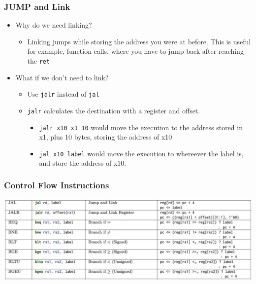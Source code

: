 \documentclass[10pt]{article}
\begin{document}
\subsubsection*{JUMP and Link}
\begin{itemize}
    \item Why do we need linking?
    \begin{itemize}
        \item Linking jumps while storing the address you were at before.  This is useful for example, function calls, where you have to jump back after reaching the \texttt{ret}
    \end{itemize}
    \item What if we don't need to link?
    \begin{itemize}
        \item Use \texttt{jalr} instead of \texttt{jal}
        \item \texttt{jalr} calculates the destination with a register and offset.
        \begin{itemize}
            \item \texttt{jalr x10 x1 10} would move the execution to the address stored in x1, plus 10 bytes, storing the address of x10
            \item \texttt{jal x10 label} would move the execution to whereever the label is, and store the address of x10.
        \end{itemize}
    \end{itemize}
\end{itemize}
\subsubsection*{Control Flow Instructions}
\begin{center}
    \includegraphics*[scale=0.51]{W1_6.png}
\end{center}
\end{document}

